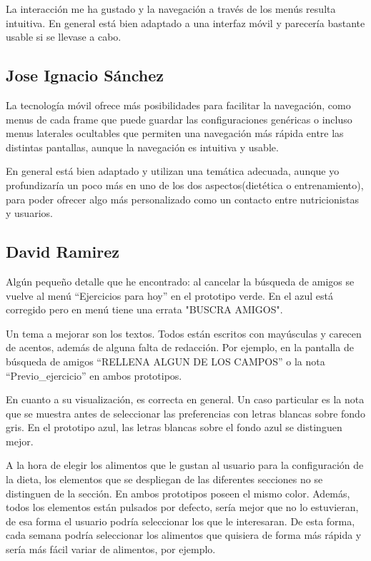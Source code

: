 \documentclass[a4paper]{article}
\begin{document}
La interacción me ha gustado y la navegación a través de los menús resulta intuitiva. En general está bien adaptado a una interfaz móvil y parecería bastante usable si se llevase a cabo.

\subsection{Jose Ignacio Sánchez}

La tecnología móvil ofrece más posibilidades para facilitar la navegación, como
menus de cada frame que puede guardar las configuraciones genéricas o incluso
menus laterales ocultables que permiten una navegación más rápida entre las
distintas pantallas, aunque la navegación es intuitiva y usable.

En general está bien adaptado y utilizan una temática adecuada, aunque yo
profundizaría un poco más en uno de los dos aspectos(dietética o entrenamiento),
para poder ofrecer algo más personalizado como un contacto entre nutricionistas
y usuarios.


\subsection{David Ramirez}

Algún pequeño detalle que he encontrado: al cancelar la búsqueda de amigos se vuelve al menú ``Ejercicios para hoy'' en el prototipo verde. En el azul está corregido pero en menú tiene una errata "BUSCRA AMIGOS".

Un tema a mejorar son los textos. Todos están escritos con mayúsculas y carecen de acentos, además de alguna falta de redacción. Por ejemplo, en la pantalla de búsqueda de amigos ``RELLENA ALGUN DE LOS CAMPOS'' o la nota ``Previo\_ejercicio'' en ambos prototipos.

En cuanto a su visualización, es correcta en general. Un caso particular es la nota que se muestra antes de seleccionar las preferencias con letras blancas sobre fondo gris. En el prototipo azul, las letras blancas sobre el fondo azul se distinguen mejor.

A la hora de elegir los alimentos que le gustan al usuario para la configuración de la dieta, los elementos que se despliegan de las diferentes secciones no se distinguen de la sección. En ambos prototipos poseen el mismo color. Además, todos los elementos están pulsados por defecto, sería mejor que no lo estuvieran, de esa forma el usuario podría seleccionar los que le interesaran. De esta forma, cada semana podría seleccionar los alimentos que quisiera de forma más rápida y sería más fácil variar de alimentos, por ejemplo.
\end{document}
